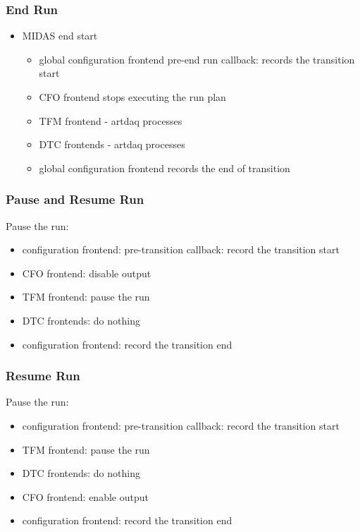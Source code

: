 \subsubsection{End Run}
\begin{itemize}
\item
  MIDAS end start
  \begin{itemize}
  \item
    global configuration frontend pre-end run callback: records
    the transition start
  \item
    CFO frontend stops executing the run plan
  \item
    TFM frontend - artdaq processes
  \item
    DTC frontends - artdaq processes
  \item
    global configuration frontend records the end of transition
  \end{itemize}
\end{itemize}


\subsubsection{Pause and Resume Run}

Pause the run:

\begin{itemize}
\item
  configuration frontend: pre-transition callback: record the transition start
\item
  CFO frontend: disable output 
\item
  TFM frontend: pause the run
\item
  DTC frontends: do nothing 
\item
  configuration frontend: record the transition end
\end{itemize}

\subsubsection{Resume Run}

Pause the run:

\begin{itemize}
\item
  configuration frontend: pre-transition callback: record the transition start
\item
  TFM frontend: pause the run
\item
  DTC frontends: do nothing 
\item
  CFO frontend: enable output 
\item
  configuration frontend: record the transition end
\end{itemize}



